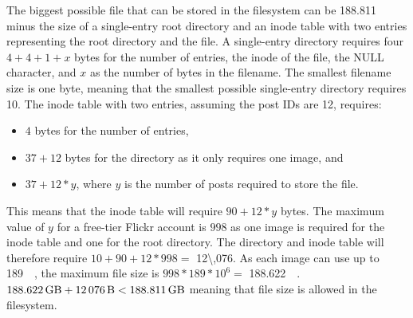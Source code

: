 The biggest possible file that can be stored in the filesystem can be \SI{188.811}{\giga\byte} minus the size of a \mbox{single-entry} root directory and an inode table with two entries representing the root directory and the file. A \mbox{single-entry} directory requires four $4 + 4 + 1 + x$ bytes for the number of entries, the inode of the file, the NULL character, and $x$ as the number of bytes in the filename. The smallest filename size is one byte, meaning that the smallest possible \mbox{single-entry} directory requires \SI[per-mode = symbol]{10}{\byte}. The inode table with two entries, assuming the post IDs are \SI[per-mode = symbol]{12}{\byte}, requires:
\begin{itemize}
	\item $4$ bytes for the number of entries,
	\item $37 + 12$ bytes for the directory as it only requires one image, and
	\item $37 + 12 * y$, where $y$ is the number of posts required to store the file.
\end{itemize}
This means that the inode table will require $90 + 12 * y$ bytes. The maximum value of $y$ for a \mbox{free-tier} Flickr account is $998$ as one image is required for the inode table and one for the root directory. The directory and inode table will therefore require $10 + 90 + 12 * 998 =$ \SI[per-mode = symbol]{12\,076}{\byte}. As each image can use up to \SI[per-mode = symbol]{189}{\mega\byte}, the maximum file size is $998 * 189*10^6 =$ \SI[per-mode = symbol]{188.622}{\giga\byte}. $\text{\SI[per-mode = symbol]{188.622}{\giga\byte}} + \text{\SI[per-mode = symbol]{12\,076}{\byte}} < \SI{188.811}{\giga\byte}$ meaning that file size is allowed in the filesystem. 

